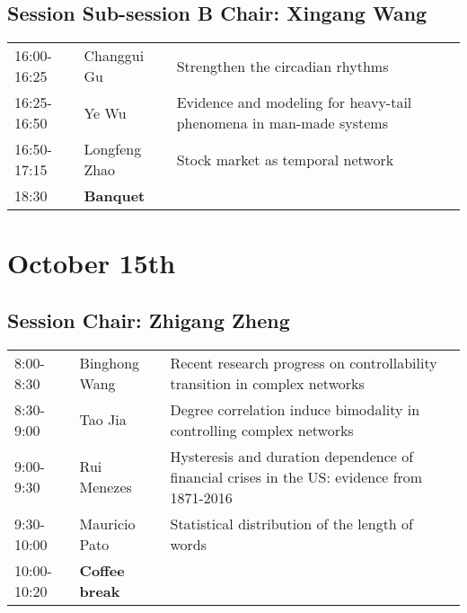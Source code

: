 \documentclass[oneside,A4paper,12pt]{article}
\begin{document}
\subsection*{Session \uppercase\expandafter{} \hspace{10mm} Sub-session B \hspace{10mm} Chair: Xingang Wang}
\label{sec:org1d0d45d}

\begin{center}
\begin{tabular}{p{2.5cm}p{4cm}p{8.5cm}}
\hline
16:00-16:25 & Changgui Gu & Strengthen the circadian rhythms\\
16:25-16:50 & Ye Wu & Evidence and modeling for heavy-tail phenomena in man-made systems\\
16:50-17:15 & Longfeng  Zhao & Stock market as temporal network\\
\cellcolor{blue!25}18:30 & \cellcolor{blue!25}\textbf{Banquet} & \cellcolor{blue!25}\\
\hline
\end{tabular}
\end{center}

\newpage

\section*{October 15th}
\label{sec:org52ca5c8}

\subsection*{Session \uppercase\expandafter{}  \hspace{10mm} Chair: Zhigang Zheng}
\label{sec:org80694a1}

\begin{center}
\begin{tabular}{p{2.5cm}p{4cm}p{8.5cm}}
\hline
8:00-8:30 & Binghong Wang & Recent research progress on controllability transition in complex networks\\
8:30-9:00 & Tao Jia & Degree correlation induce bimodality in controlling complex networks\\
9:00-9:30 & Rui Menezes & Hysteresis and duration dependence of financial crises in the US: evidence from 1871-2016\\
9:30-10:00 & Mauricio Pato & Statistical distribution of the length of words\\
\cellcolor{blue!25}10:00-10:20 & \cellcolor{blue!25}\textbf{Coffee break} & \cellcolor{blue!25}\\
\hline
\end{tabular}
\end{center}
\end{document}
